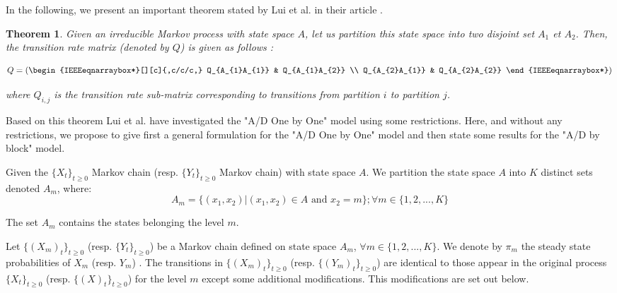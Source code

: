 \documentclass[conference]{IEEEtran}
\newtheorem{thm}{Theorem}
\begin{document}

In the following, we present an important theorem stated by  Lui et al.   in their article \cite{lui1999stochastic}.

\begin{thm}
\label{thm:thm1}
    Given an irreducible Markov process with state space $A$, let us partition this state space into two disjoint set $A_1$ et $A_2$. Then, the transition rate matrix (denoted by $Q$) is given as follows :

\begin{equation}
Q = \left(\begin{IEEEeqnarraybox*}[][c]{,c/c/c,}
    Q_{A_{1}A_{1}}       & Q_{A_{1}A_{2}} \\
    Q_{A_{2}A_{1}}       & Q_{A_{2}A_{2}} %
\end{IEEEeqnarraybox*}\right)
\end{equation}

where $Q_{i,j}$ is the transition rate sub-matrix corresponding to transitions from partition $i$ to partition $j$.

\end{thm}

Based on this theorem Lui et al. have investigated the "A/D One by One" model using some restrictions. Here, and without any restrictions, we propose to give first a general formulation for the "A/D One by One" model and then state some results for the "A/D by block" model.


Given the $\{X_{t}\}_{t \geq 0}$ Markov chain (resp. $\{Y_{t}\}_{t \geq 0}$ Markov chain) with state space $A$. We partition the state space  $A$ into $K$ distinct sets denoted $A_{m}$, where:
\begin{equation}
A_{m}=\{(x_{1},x_{2})|(x_{1},x_{2}) \in A \mbox{ and } x_{2}=m\}; \forall m \in \{1,2,...,K \}
\end{equation}

The set $A_{m}$ contains the states belonging the level $m$.

Let $\{(X_{m})_{t}\}_{t \geq 0}$ (resp. $\{Y_{t}\}_{t \geq 0}$) be a Markov chain defined on state space $A_{m}$, $\forall m \in \{1,2,...,K \}$. We denote by  $\pi_{m}$ the steady state probabilities of $ X_{m}$ (resp. $ Y_{m}$) . The transitions in $\{(X_{m})_{t}\}_{t \geq 0}$ (resp. $\{(Y_{m})_{t}\}_{t \geq 0}$) are identical to those appear in the original process $\{X_{t}\}_{t \geq 0}$ (resp. $\{(X)_{t}\}_{t \geq 0}$) for the level $m$ except some additional modifications. This modifications are set out below.
\end{document}

